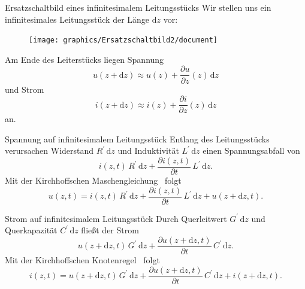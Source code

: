 \documentclass{beamer}
\begin{document}
\begin{frame}{Ersatzschaltbild eines infinitesimalem Leitungsstücks}
Wir stellen uns ein infinitesimales Leitungsstück der Länge $\mathrm{d}z$ vor:
\begin{figure}[!htb]
    \begin{center}
        \texttt{[image: graphics/Ersatzschaltbild2/document]}
    \end{center}
\end{figure}
Am Ende des Leiterstücks liegen Spannung
\[
u(z + \mathrm{d}z) \approx u(z) + \frac{\partial u}{\partial z}(z) \, \mathrm{d}z
\] und Strom
\[
i(z + \mathrm{d}z) \approx i(z) + \frac{\partial i}{\partial z}(z) \, \mathrm{d}z
\] an.
\end{frame}


\begin{frame}{Spannung auf infinitesimalem Leitungsstück}
Entlang des Leitungsstücks verursachen Widerstand $R^{\prime} \, \mathrm{d}z$ und Induktivität
$L^{\prime} \, \mathrm{d}z$ einen Spannungsabfall von
\[
i(z, t) \, R^{\prime} \, \mathrm{d}z
+
\frac{\partial i(z, t)}{\partial t} \, L^{\prime} \, \mathrm{d}z.
\]
Mit der Kirchhoffschen Maschengleichung~\cite{Kirchhoff} folgt
\begin{equation*}
    u(z, t) = i(z, t) \, R^{\prime} \, \mathrm{d}z
    +
    \frac{\partial i(z, t)}{\partial t} \, L^{\prime} \, \mathrm{d}z
    + u(z + \mathrm{d}z, t).
\end{equation*}

\end{frame}


\begin{frame}{Strom auf infinitesimalem Leitungsstück}
Durch Querleitwert $G^{\prime} \, \mathrm{d}z$ und Querkapazität $C^{\prime} \, \mathrm{d}z$ fließt der Strom
\[
u(z + \mathrm{d}z, t) \, G^{\prime} \, \mathrm{d}z
+
\frac{\partial u(z + \mathrm{d}z, t)}{\partial t} \, C^{\prime} \, \mathrm{d}z.
\]
Mit der Kirchhoffschen Knotenregel~\cite{Kirchhoff} folgt
\begin{equation*}
    i(z, t) = u(z + \mathrm{d}z, t) \, G^{\prime} \, \mathrm{d}z
    +
    \frac{\partial u(z + \mathrm{d}z, t)}{\partial t} \, C^{\prime} \, \mathrm{d}z
    + i(z + \mathrm{d}z, t).
\end{equation*}

\end{frame}
\end{document}
